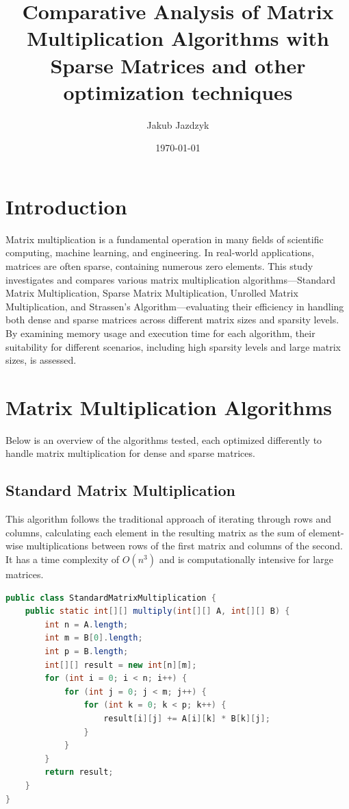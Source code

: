 \documentclass{article}
\title{Comparative Analysis of Matrix Multiplication Algorithms with Sparse Matrices and other optimization techniques}
\author{Jakub Jazdzyk}
\date{\today}
\begin{document}
\maketitle

\section{Introduction}
Matrix multiplication is a fundamental operation in many fields of scientific computing, machine learning, and engineering. In real-world applications, matrices are often sparse, containing numerous zero elements. This study investigates and compares various matrix multiplication algorithms—Standard Matrix Multiplication, Sparse Matrix Multiplication, Unrolled Matrix Multiplication, and Strassen’s Algorithm—evaluating their efficiency in handling both dense and sparse matrices across different matrix sizes and sparsity levels. By examining memory usage and execution time for each algorithm, their suitability for different scenarios, including high sparsity levels and large matrix sizes, is assessed.

\section{Matrix Multiplication Algorithms}
Below is an overview of the algorithms tested, each optimized differently to handle matrix multiplication for dense and sparse matrices.

\subsection{Standard Matrix Multiplication}
This algorithm follows the traditional approach of iterating through rows and columns, calculating each element in the resulting matrix as the sum of element-wise multiplications between rows of the first matrix and columns of the second. It has a time complexity of \(O(n^3)\) and is computationally intensive for large matrices.

\begin{lstlisting}[language=Java]
public class StandardMatrixMultiplication {
    public static int[][] multiply(int[][] A, int[][] B) {
        int n = A.length;
        int m = B[0].length;
        int p = B.length;
        int[][] result = new int[n][m];
        for (int i = 0; i < n; i++) {
            for (int j = 0; j < m; j++) {
                for (int k = 0; k < p; k++) {
                    result[i][j] += A[i][k] * B[k][j];
                }
            }
        }
        return result;
    }
}
\end{lstlisting}
\end{document}
